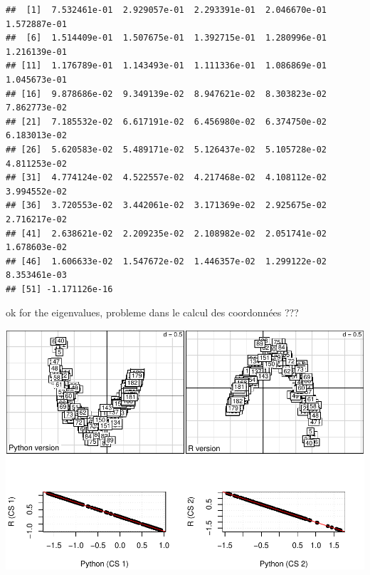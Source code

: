 \documentclass[
  10pt,
]{article}
\newenvironment{Shaded}{\begin{snugshade}}{\end{snugshade}}
\newcommand{\NormalTok}[1]{#1}
\begin{document}
\begin{verbatim}
##  [1]  7.532461e-01  2.929057e-01  2.293391e-01  2.046670e-01  1.572887e-01
##  [6]  1.514409e-01  1.507675e-01  1.392715e-01  1.280996e-01  1.216139e-01
## [11]  1.176789e-01  1.143493e-01  1.111336e-01  1.086869e-01  1.045673e-01
## [16]  9.878686e-02  9.349139e-02  8.947621e-02  8.303823e-02  7.862773e-02
## [21]  7.185532e-02  6.617191e-02  6.456980e-02  6.374750e-02  6.183013e-02
## [26]  5.620583e-02  5.489171e-02  5.126437e-02  5.105728e-02  4.811253e-02
## [31]  4.774124e-02  4.522557e-02  4.217468e-02  4.108112e-02  3.994552e-02
## [36]  3.720553e-02  3.442061e-02  3.171369e-02  2.925675e-02  2.716217e-02
## [41]  2.638621e-02  2.209235e-02  2.108982e-02  2.051741e-02  1.678603e-02
## [46]  1.606633e-02  1.547672e-02  1.446357e-02  1.299122e-02  8.353461e-03
## [51] -1.171126e-16
\end{verbatim}

ok for the eigenvalues, probleme dans le calcul des coordonnées ???

\begin{Shaded}
\end{Shaded}

\includegraphics{RandPytonAnalysisPDF_files/figure-latex/unnamed-chunk-27-1.pdf}
\end{document}

